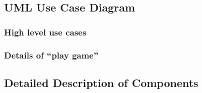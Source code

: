 \documentclass[11pt,asymmetric]{article}
\newcommand\gr[2]{\scalebox{#2}{\texttt{[image: \#1]}}}
\begin{document}
\subsection{UML Use Case Diagram}


\subsubsection{High level use cases}\begin{center}\gr{umd_use_case_diagram_01.png}{.1}\end{center}

\subsubsection{Details of ``play game''}\begin{center}\gr{umd_use_case_diagram_02.png}{.1}\end{center}



\subsection{Detailed Description of Components}
\end{document}
